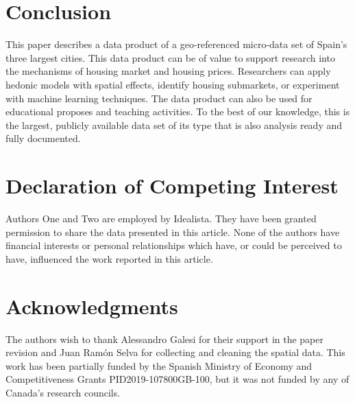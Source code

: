 \documentclass[Royal,times,sageh]{sagej}
\begin{document}
\hypertarget{conclusion}{%
\section{Conclusion}\label{conclusion}}

This paper describes a data product of a geo-referenced micro-data set
of Spain's three largest cities. This data product can be of value to
support research into the mechanisms of housing market and housing
prices. Researchers can apply hedonic models with spatial effects,
identify housing submarkets, or experiment with machine learning
techniques. The data product can also be used for educational proposes
and teaching activities. To the best of our knowledge, this is the
largest, publicly available data set of its type that is also analysis
ready and fully documented.

\hypertarget{declaration-of-competing-interest}{%
\section{Declaration of Competing
Interest}\label{declaration-of-competing-interest}}

Authors One and Two are employed by Idealista. They have been granted
permission to share the data presented in this article. None of the
authors have financial interests or personal relationships which have,
or could be perceived to have, influenced the work reported in this
article.

\hypertarget{acknowledgments}{%
\section{Acknowledgments}\label{acknowledgments}}

The authors wish to thank Alessandro Galesi for their support in the
paper revision and Juan Ramón Selva for collecting and cleaning the
spatial data. This work has been partially funded by the Spanish
Ministry of Economy and Competitiveness Grants PID2019-107800GB-100, but
it was not funded by any of Canada's research councils.



\end{document}
